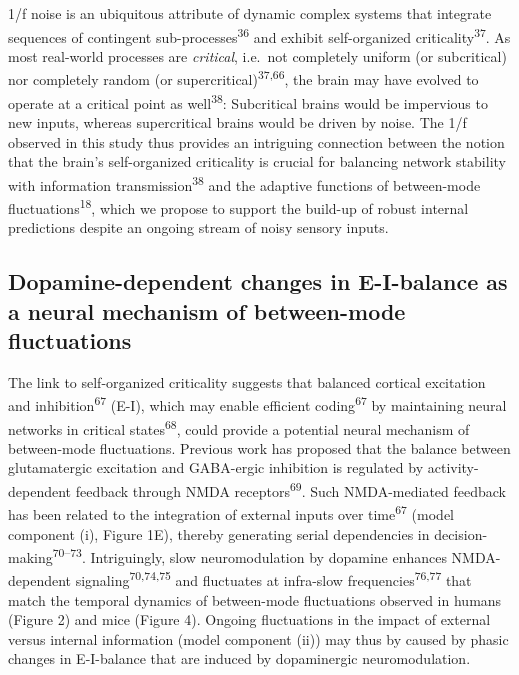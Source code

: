 \documentclass[
]{article}
\begin{document}
1/f noise is an ubiquitous attribute of dynamic complex systems that
integrate sequences of contingent sub-processes\textsuperscript{36} and
exhibit self-organized criticality\textsuperscript{37}. As most
real-world processes are \emph{critical}, i.e.~not completely uniform
(or subcritical) nor completely random (or
supercritical)\textsuperscript{37,66}, the brain may have evolved to
operate at a critical point as well\textsuperscript{38}: Subcritical
brains would be impervious to new inputs, whereas supercritical brains
would be driven by noise. The 1/f observed in this study thus provides
an intriguing connection between the notion that the brain's
self-organized criticality is crucial for balancing network stability
with information transmission\textsuperscript{38} and the adaptive
functions of between-mode fluctuations\textsuperscript{18}, which we
propose to support the build-up of robust internal predictions despite
an ongoing stream of noisy sensory inputs.

\hypertarget{dopamine-dependent-changes-in-e-i-balance-as-a-neural-mechanism-of-between-mode-fluctuations}{%
\subsection{Dopamine-dependent changes in E-I-balance as a neural
mechanism of between-mode
fluctuations}\label{dopamine-dependent-changes-in-e-i-balance-as-a-neural-mechanism-of-between-mode-fluctuations}}

The link to self-organized criticality suggests that balanced cortical
excitation and inhibition\textsuperscript{67} (E-I), which may enable
efficient coding\textsuperscript{67} by maintaining neural networks in
critical states\textsuperscript{68}, could provide a potential neural
mechanism of between-mode fluctuations. Previous work has proposed that
the balance between glutamatergic excitation and GABA-ergic inhibition
is regulated by activity-dependent feedback through NMDA
receptors\textsuperscript{69}. Such NMDA-mediated feedback has been
related to the integration of external inputs over
time\textsuperscript{67} (model component (i), Figure 1E), thereby
generating serial dependencies in
decision-making\textsuperscript{70--73}. Intriguingly, slow
neuromodulation by dopamine enhances NMDA-dependent
signaling\textsuperscript{70,74,75} and fluctuates at infra-slow
frequencies\textsuperscript{76,77} that match the temporal dynamics of
between-mode fluctuations observed in humans (Figure 2) and mice (Figure
4). Ongoing fluctuations in the impact of external versus internal
information (model component (ii)) may thus by caused by phasic changes
in E-I-balance that are induced by dopaminergic neuromodulation.
\end{document}
